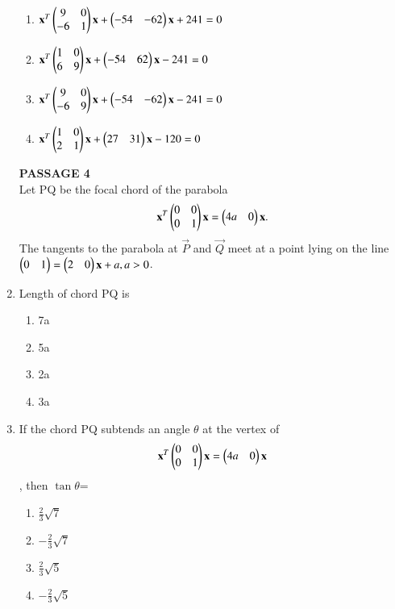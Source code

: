 \documentclass[journal,12pt,twocolumn]{IEEEtran}
\begin{document}
\begin{enumerate}[label=\arabic*]
    \begin{enumerate}
    \item $\mathbf{x}^T\begin{pmatrix}9&0\\-6&1\end{pmatrix}\mathbf{x}+\begin{pmatrix}-54&-62\end{pmatrix}\mathbf{x}+241=0$
    \item $\mathbf{x}^T\begin{pmatrix}1&0\\6&9\end{pmatrix}\mathbf{x}+\begin{pmatrix}-54&62\end{pmatrix}\mathbf{x}-241=0$
    \item $\mathbf{x}^T\begin{pmatrix}9&0\\-6&9\end{pmatrix}\mathbf{x}+\begin{pmatrix}-54&-62\end{pmatrix}\mathbf{x}-241=0$
    \item $\mathbf{x}^T\begin{pmatrix}1&0\\2&1\end{pmatrix}\mathbf{x}+\begin{pmatrix}27&31\end{pmatrix}\mathbf{x}-120=0$
    \end{enumerate}
    \textbf{PASSAGE 4}\\
    Let PQ be the focal chord of the parabola
    \begin{align}
    \mathbf{x}^T\begin{pmatrix}0&0\\0&1\end{pmatrix}\mathbf{x}=\begin{pmatrix}4a&0\end{pmatrix}\mathbf{x}.
    \end{align} The tangents to the parabola at $\vec{P}$ and $\vec{Q}$ meet at a point lying on the 		line $\begin{pmatrix}0&1\end{pmatrix}=\begin{pmatrix}2&0\end{pmatrix}\mathbf{x}+a, a>0$.
    \item Length of chord PQ is 
    \begin{enumerate}
    \item 7a
    \item 5a
    \item 2a
    \item 3a
    \end{enumerate}
    \item If the chord PQ subtends an angle $\theta$ at the vertex of
    \begin{align}
    \mathbf{x}^T\begin{pmatrix}0&0\\0&1\end{pmatrix}\mathbf{x}=\begin{pmatrix}4a&0\end{pmatrix}\mathbf{x}
    \end{align}, then $\tan\theta$=
    \begin{enumerate}
    \item $\frac{2}{3}\sqrt{7}$
    \item $-\frac{2}{3}\sqrt{7}$
    \item $\frac{2}{3}\sqrt{5}$
    \item $-\frac{2}{3}\sqrt{5}$
    \end{enumerate}


\end{enumerate}
\end{document}
